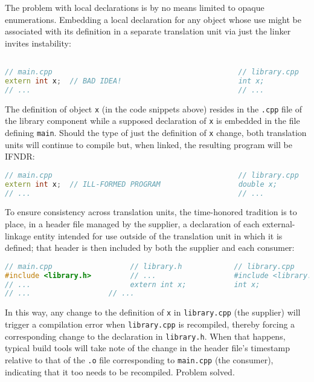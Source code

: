 The problem with local declarations is by no means limited to opaque
enumerations. Embedding a local declaration for any object whose use
might be associated with its definition in a separate translation unit
via just the linker invites instability:

\begin{lstlisting}[language=C++]

// main.cpp                                           // library.cpp
extern int x;  // BAD IDEA!                           int x;
// ...                                                // ...
\end{lstlisting}

\noindent The definition of object \lstinline!x! (in the code snippets above) resides
in the \lstinline!.cpp! file of the library component while a supposed
declaration of \lstinline!x! is embedded in the file defining
\lstinline!main!. Should the type of just the definition of \lstinline!x!
change, both translation units will continue to compile but, when
linked, the resulting program will be IFNDR:

\begin{lstlisting}[language=C++]
// main.cpp                                           // library.cpp
extern int x;  // ILL-FORMED PROGRAM                  double x;
// ...                                                // ...
\end{lstlisting}

\noindent To ensure consistency across translation units, the time-honored
tradition is to place, in a header file managed by the supplier, a
declaration of each external-linkage entity intended for use outside of
the translation unit in which it is defined; that header is then
included by both the supplier and each consumer:

\begin{lstlisting}[language=C++]
// main.cpp                  // library.h            // library.cpp
#include <library.h>         // ...                  #include <library.h>
// ...                       extern int x;           int x;
// ...                  // ...
\end{lstlisting}

\noindent In this way, any change to the definition of \lstinline!x! in
\lstinline!library.cpp! (the supplier) will trigger a compilation error
when \lstinline!library.cpp! is recompiled, thereby forcing a corresponding
change to the declaration in \lstinline!library.h!. When that happens,
typical build tools will take note of the change in the header file's
timestamp relative to that of the \lstinline!.o! file corresponding to
\lstinline!main.cpp! (the consumer), indicating that it too needs to be
recompiled. Problem solved.

